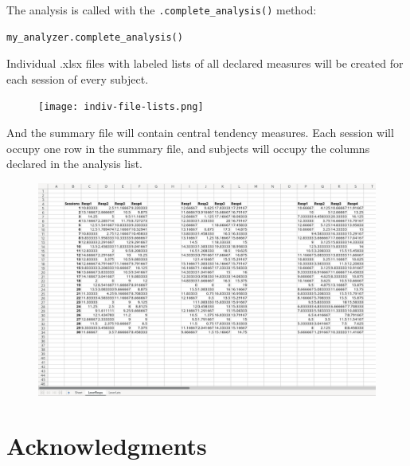 \documentclass[a4paper,12pt]{article}
\begin{document}
The analysis is called with the \verb|.complete_analysis()| method:

\begin{tcolorbox}[
    enhanced,
    attach boxed title to top left={xshift=6mm,yshift=-3mm},
    colback=lightgreen!20,
    colframe=lightgreen,
    colbacktitle=lightgreen,
    title=Python,
    fonttitle=\bfseries\color{black},
    boxed title style={size=small,colframe=lightgreen,sharp corners},
    sharp corners,
    ]
    \begin{verbatim}
my_analyzer.complete_analysis()
    \end{verbatim}
\end{tcolorbox}

Individual .xlsx files with labeled lists of all declared measures will be created for each session of every subject.

\begin{figure}[!ht]
    \begin{center}
        \texttt{[image: indiv-file-lists.png]}
    \end{center}
\end{figure}

And the summary file will contain central tendency measures. Each session will occupy one row in the summary file, and subjects will occupy the columns declared in the analysis list.

\begin{figure}[!ht]
    \begin{center}
        \includegraphics[scale=0.35]{summary-file.png}
    \end{center}
\end{figure}

\newpage
\section{Acknowledgments}
\end{document}
